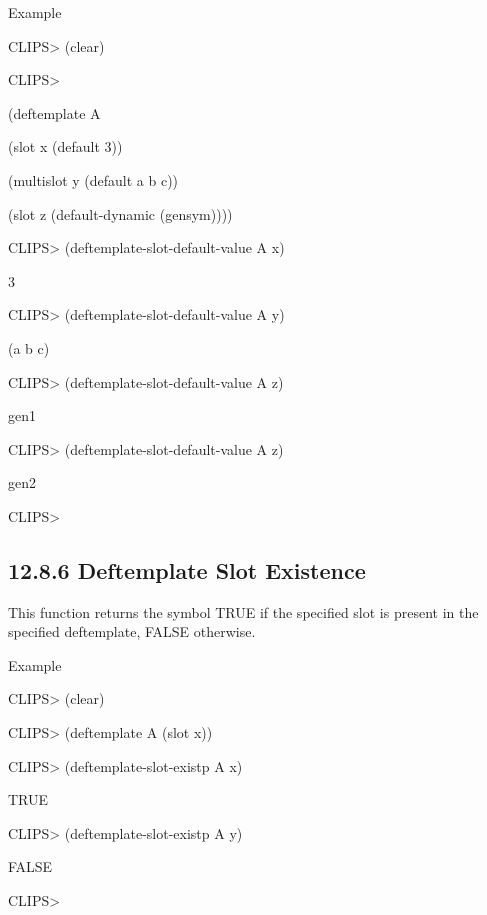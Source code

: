 \documentclass[letterpaper,10pt,english]{sphinxmanual}
\begin{document}
Example

CLIPS\textgreater{} (clear)

CLIPS\textgreater{}

(deftemplate A

(slot x (default 3))

(multislot y (default a b c))

(slot z (default-dynamic (gensym))))

CLIPS\textgreater{} (deftemplate-slot-default-value A x)

3

CLIPS\textgreater{} (deftemplate-slot-default-value A y)

(a b c)

CLIPS\textgreater{} (deftemplate-slot-default-value A z)

gen1

CLIPS\textgreater{} (deftemplate-slot-default-value A z)

gen2

CLIPS\textgreater{}


\subsection{12.8.6 Deftemplate Slot Existence}
\label{\detokenize{actions:deftemplate-slot-existence}}
This function returns the symbol TRUE if the specified slot is present
in the specified deftemplate, FALSE otherwise.


\begin{sphinxVerbatim}[commandchars=\\\{\}]
  
\end{sphinxVerbatim}

Example

CLIPS\textgreater{} (clear)

CLIPS\textgreater{} (deftemplate A (slot x))

CLIPS\textgreater{} (deftemplate-slot-existp A x)

TRUE

CLIPS\textgreater{} (deftemplate-slot-existp A y)

FALSE

CLIPS\textgreater{}
\end{document}
